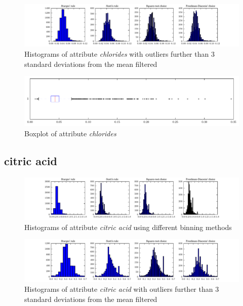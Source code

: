 \documentclass{report}
\begin{document}
\begin{figure}[H]
\includegraphics[width=\textwidth]{histograms/chlorides_filtered.pdf}
\caption{Histograms of attribute \emph{chlorides} with outliers further than 3 standard deviations from the mean filtered}
\end{figure}

\begin{figure}[H]
\includegraphics[width=\textwidth]{boxplots/chlorides.pdf}
\caption{Boxplot of attribute \emph{chlorides}}\end{figure}

\newpage\subsection{citric acid}
\begin{figure}[H]
\includegraphics[width=\textwidth]{histograms/citric_acid.pdf}
\caption{Histograms of attribute \emph{citric acid} using different binning methods}\end{figure}

\begin{figure}[H]
\includegraphics[width=\textwidth]{histograms/citric_acid_filtered.pdf}
\caption{Histograms of attribute \emph{citric acid} with outliers further than 3 standard deviations from the mean filtered}
\end{figure}
\end{document}
